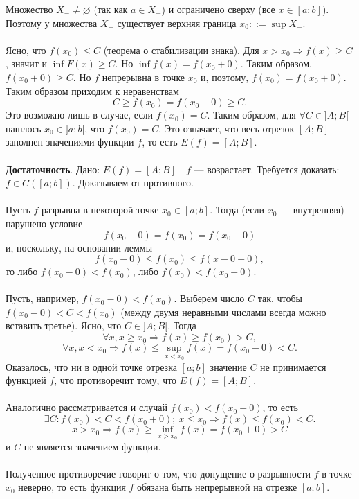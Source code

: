\begin{Proof}
	Множество $X_{-} \ne \varnothing$ (так как $a \in X_{-}$) и ограничено сверху (все $x \in [a; b]$). Поэтому у множества $X_{-}$ существует верхняя граница $x_0::= \sup{X_{-}}$.\\\\
	Ясно, что $f(x_0) \leqslant C$ (теорема о стабилизации знака).
	Для $x > x_0 \Rightarrow f(x) \geqslant C$,
	значит и $\inf{F(x)} \geqslant C$.
	Но $\inf{f(x)} = f(x_0 +0)$.
	Таким образом, $f(x_0 +0) \geqslant C$.
	Но $f$ непрерывна в точке $x_0$ и, поэтому, $f(x_0) = f(x_0+0)$.
	Таким образом приходим к неравенствам  $$C \geqslant f(x_0) = f(x_0+0) \geqslant C.$$
	Это возможно лишь в случае, если $f(x_0) = C$. Таким образом, для $\forall C \in ]A; B[$ нашлось $x_0 \in ]a; b[$, что $f(x_0) = C$. Это означает, что весь отрезок $[A; B]$ заполнен значениями функции $f$, то есть $E(f) = [A; B]$.\\\\
	\textbf{Достаточность}.
	Дано: $E(f) = [A; B] \quad f$ --- возрастает.
	Требуется доказать: $f \in C([a; b])$.
	Доказываем от противного.\\\\
	Пусть $f$ разрывна в некоторой точке $x_0 \in [a; b]$. Тогда (если $x_0$ --- внутренняя) нарушено условие $$f(x_0-0) = f(x_0) = f(x_0+0)$$ и, поскольку, на основании леммы
	$$f(x_0-0) \leqslant f(x_0) \leqslant f(x-0+0),$$ то либо $f(x_0-0) < f(x_0)$, либо $f(x_0) < f(x_0+0)$.\\\\
	Пусть, например, $f(x_0-0) < f(x_0)$.
	Выберем число $C$ так, чтобы $f(x_0-0) < C < f(x_0)$ (между двумя неравными числами всегда можно вставить третье).
	Ясно, что $C \in ]A; B[$.
	Тогда $$\forall x, x \geqslant x_0 \Rightarrow f(x) \geqslant f(x_0) > C,$$
	$$\forall x, x < x_0 \Rightarrow f(x) \leqslant \underset{x < x_0}{\sup}f(x) = f(x_0-0) < C.$$
	Оказалось, что ни в одной точке отрезка $[a; b]$ значение $C$ не принимается функцией $f$, что противоречит тому, что $E(f) = [A; B]$.\\\\ Аналогично рассматривается и случай $f(x_0) < f(x_0+0)$, то есть
	$$\exists C: f(x_0) < C < f(x_0+0);\ x \leqslant x_0 \Rightarrow f(x) \leqslant f(x_0) < C.$$
	$$x > x_0 \Rightarrow f(x) \geqslant \underset{x > x_0}{\inf}f(x) = f(x_0+0) > C$$
	и $C$ не является значением функции.\\\\ Полученное противоречие говорит о том, что допущение о разрывности $f$ в точке $x_0$ неверно, то есть функция $f$ обязана быть непрерывной на отрезке $[a; b]$.
\end{Proof}
